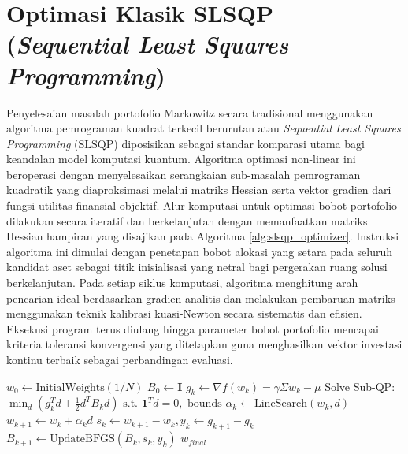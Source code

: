 \section{Optimasi Klasik SLSQP (\textit{Sequential Least Squares Programming})}
Penyelesaian masalah portofolio Markowitz secara tradisional menggunakan algoritma pemrograman kuadrat terkecil berurutan atau \textit{Sequential Least Squares Programming} (SLSQP) diposisikan sebagai standar komparasi utama bagi keandalan model komputasi kuantum. Algoritma optimasi non-linear ini beroperasi dengan menyelesaikan serangkaian sub-masalah pemrograman kuadratik yang diaproksimasi melalui matriks Hessian serta vektor gradien dari fungsi utilitas finansial objektif. Alur komputasi untuk optimasi bobot portofolio dilakukan secara iteratif dan berkelanjutan dengan memanfaatkan matriks Hessian hampiran yang disajikan pada Algoritma \ref{alg:slsqp_optimizer}. Instruksi algoritma ini dimulai dengan penetapan bobot alokasi yang setara pada seluruh kandidat aset sebagai titik inisialisasi yang netral bagi pergerakan ruang solusi berkelanjutan. Pada setiap siklus komputasi, algoritma menghitung arah pencarian ideal berdasarkan gradien analitis dan melakukan pembaruan matriks menggunakan teknik kalibrasi kuasi-Newton secara sistematis dan efisien. Eksekusi program terus diulang hingga parameter bobot portofolio mencapai kriteria toleransi konvergensi yang ditetapkan guna menghasilkan vektor investasi kontinu terbaik sebagai perbandingan evaluasi.

\begin{algorithm}[ht]
\caption{Optimasi Klasik Markowitz menggunakan SLSQP}
\label{alg:slsqp_optimizer}
\begin{algorithmic}[1]
    \State $w_0 \gets \text{InitialWeights}(1/N)$ 
    \State $B_0 \gets \mathbf{I}$ 
        \State $g_k \gets \nabla f(w_k) = \gamma \Sigma w_k - \mu$ 
        \State Solve Sub-QP: $\min_{d} (g_k^T d + \frac{1}{2} d^T B_k d) \text{ s.t. } \mathbf{1}^T d = 0, \text{ bounds}$
        \State $\alpha_k \gets \text{LineSearch}(w_k, d)$ 
        \State $w_{k+1} \gets w_k + \alpha_k d$ 
        \State $s_k \gets w_{k+1} - w_k, y_k \gets g_{k+1} - g_k$
        \State $B_{k+1} \gets \text{UpdateBFGS}(B_k, s_k, y_k)$ 
    \EndFor
    \State \Return $w_{final}$
\EndProcedure
\end{algorithmic}
\end{algorithm}
